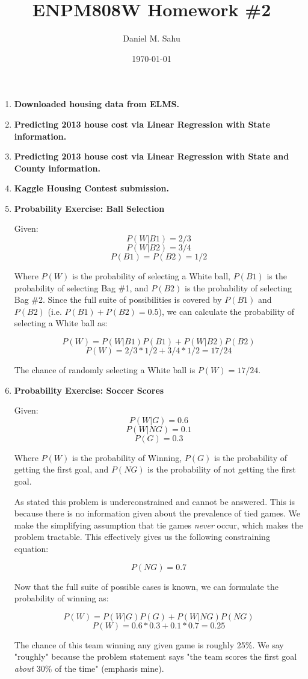 \documentclass[12pt]{article}
\title{ENPM808W Homework \#2}
\author{Daniel M. Sahu}
\date{\today}
\begin{document}
\maketitle
\begin{enumerate}[leftmargin=\labelsep]
\item \textbf{Downloaded housing data from ELMS.}
\item \textbf{Predicting 2013 house cost via Linear Regression with State information.}
\item \textbf{Predicting 2013 house cost via Linear Regression with State and County information.}
\item \textbf{Kaggle Housing Contest submission.}
\item \textbf{Probability Exercise: Ball Selection}

  Given:
    \[ P(W | B1) = 2/3 \]
    \[ P(W | B2) = 3/4 \]
    \[ P(B1) = P(B2) = 1/2 \]

  Where \(P(W)\) is the probability of selecting a White ball, \(P(B1)\) is the probability of selecting Bag \#1, and \(P(B2)\) is the probability of selecting Bag \#2.
  Since the full suite of possibilities is covered by \(P(B1)\) and \(P(B2)\) (i.e. \( P(B1) + P(B2) = 0.5 \)), we can calculate the probability of selecting a White ball as:

    \[ P(W) = P(W | B1) P(B1) + P(W | B2) P(B2) \]
    \[ P(W) = 2/3 * 1/2 + 3/4 * 1/2 = 17/24 \]

  The chance of randomly selecting a White ball is \(P(W) = 17/24\).

\item \textbf{Probability Exercise: Soccer Scores}

  Given:
    \[ P(W | G) = 0.6 \]
    \[ P(W | NG) = 0.1 \]
    \[ P(G) = 0.3 \]

  Where \(P(W)\) is the probability of Winning, \(P(G)\) is the probability of getting the first goal, and \(P(NG)\) is the probability of not getting the first goal.
  
  As stated this problem is underconstrained and cannot be answered. This is because there is no information given about the prevalence of tied games. We make the simplifying assumption that tie games \emph{never} occur, which makes the problem tractable. This effectively gives us the following constraining equation:

    \[ P(NG) = 0.7 \]

  Now that the full suite of possible cases is known, we can formulate the probability of winning as:

    \[ P(W) = P(W | G) P(G) + P(W | NG) P(NG) \]
    \[ P(W) = 0.6 * 0.3 + 0.1 * 0.7 = 0.25 \]

    The chance of this team winning any given game is roughly 25\%. We say "roughly" because the problem statement says "the team scores the first goal \emph{about} 30\% of the time" (emphasis mine).

\end{enumerate}
\end{document}
